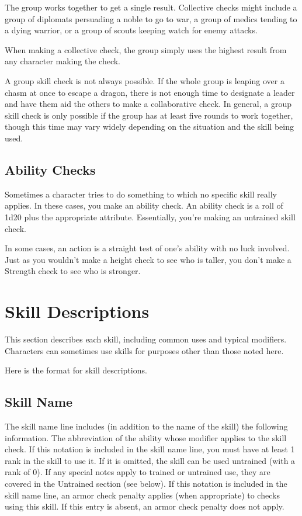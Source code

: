  The group works together to get a single result. Collective checks might include a group of diplomats persuading a noble to go to war, a group of medics tending to a dying warrior, or a group of scouts keeping watch for enemy attacks.

When making a collective check, the group simply uses the highest result from any character making the check.

 A group skill check is not always possible. If the whole group is leaping over a chasm at once to escape a dragon, there is not enough time to designate a leader and have them aid the others to make a collaborative check. In general, a group skill check is only possible if the group has at least five rounds to work together, though this time may vary widely depending on the situation and the skill being used. 

\subsection{Ability Checks}
Sometimes a character tries to do something to which no specific skill really applies. In these cases, you make an ability check. An ability check is a roll of 1d20 plus the appropriate attribute. Essentially, you're making an untrained skill check.

In some cases, an action is a straight test of one's ability with no luck involved. Just as you wouldn't make a height check to see who is taller, you don't make a Strength check to see who is stronger.

\section{Skill Descriptions}
This section describes each skill, including common uses and typical modifiers. Characters can sometimes use skills for purposes other than those noted here.

Here is the format for skill descriptions.

\subsection*{Skill Name}
The skill name line includes (in addition to the name of the skill) the following information.
 The abbreviation of the ability whose modifier applies to the skill check.
 If this notation is included in the skill name line, you must have at least 1 rank in the skill to use it. If it is omitted, the skill can be used untrained (with a rank of 0). If any special notes apply to trained or untrained use, they are covered in the Untrained section (see below).
 If this notation is included in the skill name line, an armor check penalty applies (when appropriate) to checks using this skill. If this entry is absent, an armor check penalty does not apply.

